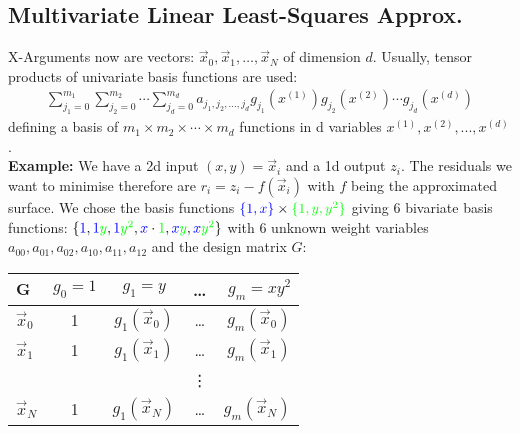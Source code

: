 \subsection{Multivariate Linear Least-Squares Approx.}

X-Arguments now are vectors:
$\vec{x}_0, \vec{x}_1, \ldots, \vec{x}_N$ of dimension $d$.
Usually, tensor products of univariate basis functions are used:
\begin{align*}
    \sum_{j_1=0}^{m_1} \sum_{j_2=0}^{m_2}\cdots \sum_{j_d=0}^{m_d}
    a_{j_1, j_2, \ldots, j_d}g_{j_1}(x^{(1)})g_{j_2}(x^{(2)})\cdots g_{j_d}(x^{(d)})
\end{align*}
defining a basis of $m_1\times m_2\times \cdots \times m_d$ functions in d variables $x^{(1)}, x^{(2)},...,x^{(d)}$.
\\[1em]
\textbf{Example:}
We have a 2d input $(x,y)=\vec{x}_i$ and a 1d output $z_i$.
The residuals we want to minimise therefore are $r_i=z_i-f(\vec{x}_i)$ with $f$ being the approximated surface.
We chose the basis functions ${\color{blue}\{1, x\}}\times{\color{green}\{1, y, y^2\}}$ giving 6 bivariate basis functions:
$\{{\color{blue}1}, {\color{blue}1}{\color{green}y}, {\color{blue}1}{\color{green}y^2},
    {\color{blue}x}\cdot{\color{green}1}, {\color{blue}x}{\color{green}y}, {\color{blue}x}{\color{green}y^2}
\}$ with 6 unknown weight variables $a_{00}, a_{01}, a_{02}, a_{10}, a_{11}, a_{12}$ and the design matrix $G$:

\begin{center}
    \begin{tabular}{l|cccr}
        $\mathbf{G}$ & $g_0 = 1$ & $g_1 = y$        & \ldots & $g_m=xy^2$       \\
        \hline
        $\vec{x}_0$  & 1         & $g_1(\vec{x}_0)$ & \ldots & $g_m(\vec{x}_0)$ \\
        $\vec{x}_1$  & 1         & $g_1(\vec{x}_1)$ & \ldots & $g_m(\vec{x}_1)$ \\
                     &           &                  & \vdots &                  \\
        $\vec{x}_N$  & 1         & $g_1(\vec{x}_N)$ & \ldots & $g_m(\vec{x}_N)$ \\
    \end{tabular}
\end{center}
